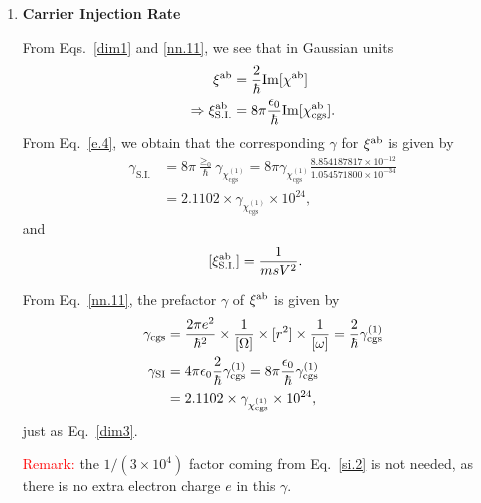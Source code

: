 \documentclass[12pt]{article}
\numberwithin{equation}{section}
\begin{document}
\begin{enumerate}
\item {\bf Carrier Injection Rate}

From Eqs.~\eqref{dim1} and \eqref{nn.11}, we see that 
in Gaussian units
 \begin{align}\label{dim2}
\xi^{\mathrm{a}\mathrm{b}}
&=\frac{2}{\hbar}\mathrm{Im}[\chi^{\mathrm{a}\mathrm{b}}]
\nonumber\\
\Rightarrow  
\xi^{\mathrm{a}\mathrm{b}}_{\mathrm{S.I.}}
&=8\pi\frac{\epsilon_0}{\hbar}\mathrm{Im}[\chi^{\mathrm{a}\mathrm{b}}_{\mathrm{cgs}}]
. 
\end{align}   
From Eq.~\eqref{e.4}, we obtain that the corresponding $\gamma$ for 
$\xi^{\mathrm{a}\mathrm{b}}$ is given by
 \begin{align}\label{dim3}
\gamma _{\mathrm{S.I.}}
&=8\pi\frac{\ge_0}{\hbar}
\gamma_{\chi^{(1)}_{\mathrm{cgs}}} 
=
8\pi\gamma_{\chi^{(1)}_{\mathrm{cgs}}} \frac{8.854 187 817 \times 10^{-12}}{1.054571800\times 10^{-34}}
\nonumber\\
&=
2.1102 \times  
\gamma_{\chi^{(1)}_{\mathrm{cgs}}} 
\times 10^{24}
, 
\end{align} 
and 
 \begin{align}\label{dim21}
[\xi^{\mathrm{a}\mathrm{b}}_{\mathrm{S.I.}}]
&=
\frac{1}{msV^2}
. 
\end{align}  

From Eq.~\eqref{nn.11}, the prefactor $\gamma$ of $\xi^{\mathrm{a}\mathrm{b}}$ is given by 
\begin{align}\label{ne.4nn}
\gamma_{\mathrm{cgs}} 
&=
\frac{2\pi e^2}{\hbar^2}\times\frac{1}{[\Omega]}
\times [r^2] \times \frac{1}{[\omega]}
=\frac{2}{\hbar}
\gamma^{(1)}_{\mathrm{cgs}}
\nonumber\\
\gamma_{\mathrm{SI}} 
&=4\pi\epsilon_0\frac{2}{\hbar}
\gamma^{(1)}_{\mathrm{cgs}}
=8\pi\frac{\epsilon_0}{\hbar}
\gamma^{(1)}_{\mathrm{cgs}}
\nonumber\\
&=
2.1102 \times  
\gamma_{\chi^{(1)}_{\mathrm{cgs}}} 
\times 10^{24}
,
\end{align}
just as Eq.~\eqref{dim3}.

\textcolor{red}{Remark:} the $1/(3\times 10^4)$ factor coming from 
Eq.~\eqref{si.2} is not needed, as there is no extra electron charge $e$ in 
this $\gamma$. 



\end{enumerate}
\end{document}
